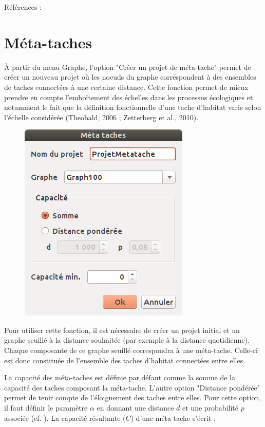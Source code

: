 \documentclass{article}
\begin{document}
Références : 
\cite{2015_addpatch_rainette, 2014_LUP}

\section{Méta-taches}

À partir du menu Graphe, l'option "Créer un projet de méta-tache" permet de créer un nouveau projet où les noeuds du graphe correspondent à des ensembles de taches connectées à une certaine distance. Cette fonction permet de mieux prendre en compte l’emboîtement des échelles dans les processus écologiques et notamment le fait que la définition fonctionnelle d’une tache d’habitat varie selon l’échelle considérée (Theobald, 2006 ; Zetterberg et al., 2010).

\begin{figure}[H]
	\includegraphics[scale=0.5]{img/manual-fr_metapatch.png} 
\end{figure}

Pour utiliser cette fonction, il est nécessaire de créer un projet initial et un graphe seuillé à la distance souhaitée (par exemple à la distance quotidienne). Chaque composante de ce graphe seuillé correspondra à une méta-tache. Celle-ci est donc constituée de l’ensemble des taches d’habitat connectées entre elles.

La capacité des méta-taches est définie par défaut comme la somme de la capacité des taches composant la méta-tache. L'autre option "Distance pondérée" permet de tenir compte de l'éloignement des taches entre elles. Pour cette option, il faut définir le paramètre $\alpha$ en donnant une distance $d$ et une probabilité $p$ associée (cf. ). La capacité résultante ($C$) d'une méta-tache s'écrit : 
\end{document}
